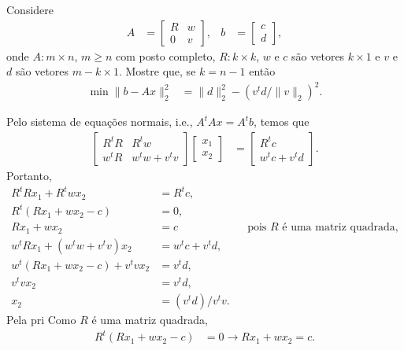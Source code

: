 \begin{questions}
    \question Considere
    \begin{align*}
        A &= \begin{bmatrix}
            R & w \\
            0 & v
        \end{bmatrix}, & b &= \begin{bmatrix}
            c \\
            d
        \end{bmatrix},
    \end{align*}
    onde $A : m \times n$, $m \geq n$ com posto completo, $R : k \times k$, $w$ e $c$ s\~{a}o vetores $k \times 1$ e $v$ e $d$ s\~{a}o vetores $m - k \times 1$. Mostre que, se $k = n - 1$ ent\~{a}o 
    \begin{align*}
        \min \| b - A x \|_2^2 &= \| d \|_2^2 - \left( v^t d / \| v \|_2 \right)^2.
    \end{align*}
    \begin{solution}
        Pelo sistema de equa\c{c}\~{o}es normais, i.e., $A^t A x = A^t b$, temos que
        \begin{align*}
            \begin{bmatrix}
                R^t R & R^t w \\
                w^t R & w^t w + v^t v
            \end{bmatrix} \begin{bmatrix}
                x_1 \\
                x_2
            \end{bmatrix} &= \begin{bmatrix}
                R^t c \\
                w^t c + v^t d
            \end{bmatrix}.
        \end{align*}
        Portanto,
        \begin{align*}
            R^t R x_1 + R^t w x_2 &= R^t c, \\
            R^t \left( R x_1 + w x_2 - c \right) &= 0, \\
            R x_1 + w x_2 &= c && \text{pois $R$ \'{e} uma matriz quadrada,} \\
            w^t R x_1 + \left( w^t w + v^t v \right) x_2 &= w^t c + v^t d, \\
            w^t \left( R x_1 + w x_2 - c \right) + v^t v x_2 &= v^t d, \\
            v^t v x_2 &= v^t d, \\
            x_2 &= \left( v^t d \right) / v^t v.
        \end{align*}
        Pela pri
        Como $R$ \'{e} uma matriz quadrada,
        \begin{align*}
            R^t \left( R x_1 + w x_2 - c \right) &= 0 \rightarrow R x_1 + w x_2 = c.
        \end{align*}


\end{solution}
\end{questions}

